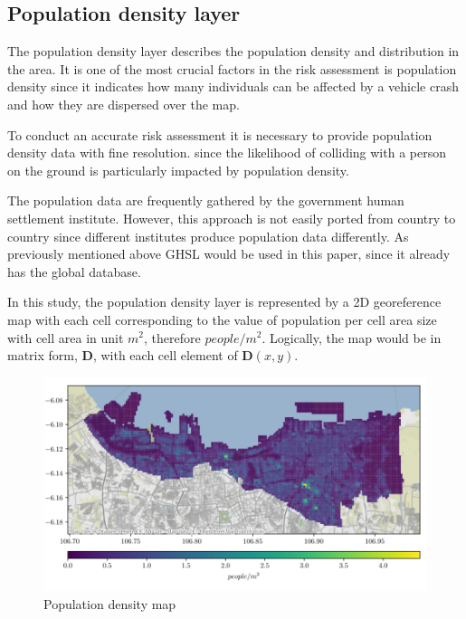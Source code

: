 \documentclass[12pt]{report}
\begin{document}
        \subsection{Population density layer}
            The population density layer describes the population density and distribution in the area. It is one of the
            most crucial factors in the risk assessment is population density since it indicates how many individuals
            can be affected by a vehicle crash and how they are dispersed over the map.

            To conduct an accurate risk assessment it is necessary to provide population density data with fine
            resolution. since the likelihood of colliding with a person on the ground is particularly impacted by
            population density.

            The population data are frequently gathered by the government human settlement institute. However, this
            approach is not easily ported from country to country since different institutes produce population data
            differently. As previously mentioned above GHSL would be used in this paper, since it already has the global
            database.

            In this study, the population density layer is represented by a 2D georeference map with each cell
            corresponding to the value of population per cell area size with cell area in unit \(m^2\), therefore
            \(people/m^2\). Logically, the map would be in matrix form, \textbf{D}, with each cell element of
            \(\mathbf{D}(x, y)\).

            \begin{figure}[H]
                \centering
                \includegraphics[width=\textwidth]{Plot/pop_dense.PNG}
                \caption{Population density map}
            \end{figure}
\end{document}
